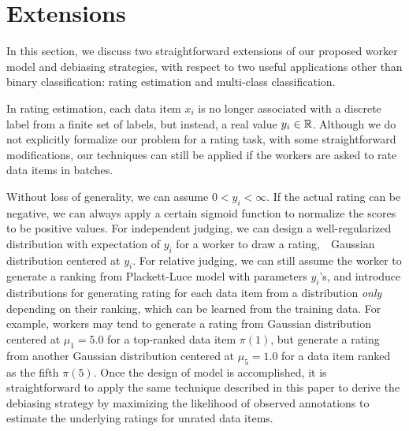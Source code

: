 
\section{Extensions}
\label{sec:ext}

In this section, we discuss two straightforward extensions of our proposed worker model and debiasing strategies, 
with respect to two useful applications other than binary classification: 
rating estimation and multi-class classification.  

In rating estimation,
each data item $x_i$ is no longer associated with a discrete label
from a finite set of labels, 
but instead, a real value $y_i \in {\mathbb{R}}$.  
Although we do not explicitly formalize our problem for a rating task, 
with some straightforward modifications, 
our techniques can still be applied 
if the workers are asked to rate data items in batches.  

Without loss of generality, we can assume $0 < y_i < \infty$.  
If the actual rating can be negative, 
we can always apply a certain sigmoid function to normalize the scores to be positive values.  
For independent judging, we can design a well-regularized distribution with expectation of $y_i$ 
for a worker to draw a rating,~\eg~Gaussian distribution centered at $y_i$.  
For relative judging, we can still assume the worker to generate a ranking from Plackett-Luce model with parameters $y_i$'s, 
and introduce distributions for generating rating for each data item
from a distribution \emph{only} depending on their ranking, 
which can be learned from the training data.  
For example, workers may tend to generate a rating from Gaussian distribution centered at $\mu_1=5.0$ for a top-ranked data item $\pi(1)$, 
but generate a rating from another Gaussian distribution centered at $\mu_5=1.0$ for a data item ranked as the fifth $\pi(5)$.  
Once the design of model is accomplished, 
it is straightforward to apply the same technique described in this paper 
to derive the debiasing strategy by maximizing the likelihood of observed annotations 
to estimate the underlying ratings for unrated data items.  


